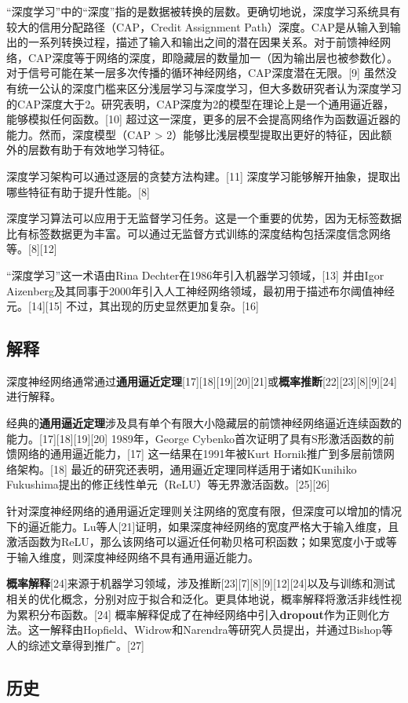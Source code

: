 “深度学习”中的“深度”指的是数据被转换的层数。更确切地说，深度学习系统具有较大的信用分配路径（CAP，Credit Assignment Path）深度。CAP是从输入到输出的一系列转换过程，描述了输入和输出之间的潜在因果关系。对于前馈神经网络，CAP深度等于网络的深度，即隐藏层的数量加一（因为输出层也被参数化）。对于信号可能在某一层多次传播的循环神经网络，CAP深度潜在无限。[9] 虽然没有统一公认的深度门槛来区分浅层学习与深度学习，但大多数研究者认为深度学习的CAP深度大于2。研究表明，CAP深度为2的模型在理论上是一个通用逼近器，能够模拟任何函数。[10] 超过这一深度，更多的层不会提高网络作为函数逼近器的能力。然而，深度模型（CAP > 2）能够比浅层模型提取出更好的特征，因此额外的层数有助于有效地学习特征。

深度学习架构可以通过逐层的贪婪方法构建。[11] 深度学习能够解开抽象，提取出哪些特征有助于提升性能。[8]

深度学习算法可以应用于无监督学习任务。这是一个重要的优势，因为无标签数据比有标签数据更为丰富。可以通过无监督方式训练的深度结构包括深度信念网络等。[8][12]

“深度学习”这一术语由Rina Dechter在1986年引入机器学习领域，[13] 并由Igor Aizenberg及其同事于2000年引入人工神经网络领域，最初用于描述布尔阈值神经元。[14][15] 不过，其出现的历史显然更加复杂。[16]
\subsection{解释}
深度神经网络通常通过\textbf{通用逼近定理}[17][18][19][20][21]或\textbf{概率推断}[22][23][8][9][24]进行解释。

经典的\textbf{通用逼近定理}涉及具有单个有限大小隐藏层的前馈神经网络逼近连续函数的能力。[17][18][19][20] 1989年，George Cybenko首次证明了具有S形激活函数的前馈网络的通用逼近能力，[17] 这一结果在1991年被Kurt Hornik推广到多层前馈网络架构。[18] 最近的研究还表明，通用逼近定理同样适用于诸如Kunihiko Fukushima提出的修正线性单元（ReLU）等无界激活函数。[25][26]

针对深度神经网络的通用逼近定理则关注网络的宽度有限，但深度可以增加的情况下的逼近能力。Lu等人[21]证明，如果深度神经网络的宽度严格大于输入维度，且激活函数为ReLU，那么该网络可以逼近任何勒贝格可积函数；如果宽度小于或等于输入维度，则深度神经网络不具有通用逼近能力。

\textbf{概率解释}[24]来源于机器学习领域，涉及推断[23][7][8][9][12][24]以及与训练和测试相关的优化概念，分别对应于拟合和泛化。更具体地说，概率解释将激活非线性视为累积分布函数。[24] 概率解释促成了在神经网络中引入\textbf{dropout}作为正则化方法。这一解释由Hopfield、Widrow和Narendra等研究人员提出，并通过Bishop等人的综述文章得到推广。[27]
\subsection{历史}
